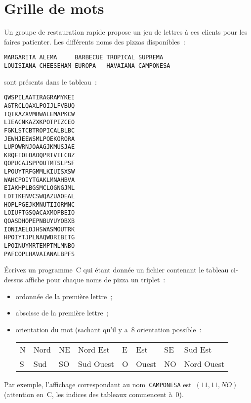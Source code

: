 \section{Grille de mots}
Un groupe de restauration rapide propose un jeu de lettres \`a ces
clients pour les faires patienter.  Les diff\'erents noms des pizzas
disponibles~:
\begin{verbatim}
MARGARITA ALEMA     BARBECUE TROPICAL SUPREMA 
LOUISIANA CHEESEHAM EUROPA   HAVAIANA CAMPONESA
\end{verbatim}
sont pr\'esents dans le tableau~:
\begin{verbatim}
QWSPILAATIRAGRAMYKEI
AGTRCLQAXLPOIJLFVBUQ
TQTKAZXVMRWALEMAPKCW
LIEACNKAZXKPOTPIZCEO
FGKLSTCBTROPICALBLBC
JEWHJEEWSMLPOEKORORA
LUPQWRNJOAAGJKMUSJAE
KRQEIOLOAOQPRTVILCBZ
QOPUCAJSPPOUTMTSLPSF
LPOUYTRFGMMLKIUISXSW
WAHCPOIYTGAKLMNAHBVA
EIAKHPLBGSMCLOGNGJML
LDTIKENVCSWQAZUAOEAL
HOPLPGEJKMNUTIIORMNC
LOIUFTGSQACAXMOPBEIO
QOASDHOPEPNBUYUYOBXB
IONIAELOJHSWASMOUTRK
HPOIYTJPLNAQWDRIBITG
LPOINUYMRTEMPTMLMNBO
PAFCOPLHAVAIANALBPFS
\end{verbatim}
\'Ecrivez un programme~C qui  \'etant donn\'ee  un fichier contenant  le
tableau ci-dessus affiche pour chaque noms de pizza un triplet~:
\begin{itemize}
\item ordonn\'ee de la premi\`ere lettre~;
\item abscisse de la premi\`ere lettre~;
\item orientation du mot (sachant qu'il y a~$8$ orientation possible~:
  \par
  \begin{center}
    \begin{tabular}{llllllll}
      N & Nord & NE & Nord Est & E & Est & SE & Sud Est \\
      S & Sud & SO & Sud Ouest & O & Ouest & NO & Nord Ouest
    \end{tabular}
  \end{center}
\end{itemize}
Par exemple, l'affichage correspondant au nom~\texttt{CAMPONESA}
est~$(11,11,NO)$ (attention en~C, les indices des tableaux commencent
\`a~$0$).
